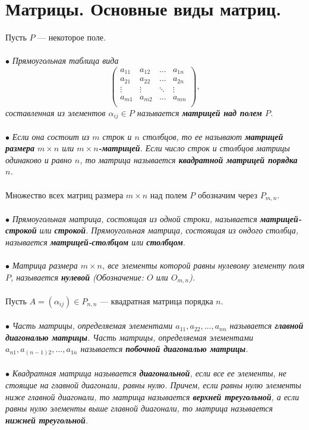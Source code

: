 \section{Матрицы. Основные виды матриц.}
Пусть $P$ --- некоторое поле.\\\\
$\bullet$ \textit{Прямоугольная таблица вида $$\begin{pmatrix}
		a_{11} & a_{12} & \dots & a_{1n}\\
		a_{21} & a_{22} & \dots & a_{2n}\\
		\vdots & \vdots & \ddots & \vdots\\
		a_{m1} & a_{m2} & \dots & a_{mn}\\
	\end{pmatrix},$$ составленная из элементов $\alpha_{ij}\in P$ называется \textbf{матрицей над полем} $P$.}\\\\
$\bullet$\textit{ Если она состоит из $m$ строк и $n$ столбцов, то ее называют \textbf{матрицей размера} $m\times n$ или $m\times n$\textbf{-матрицей}. Если число строк и столбцов матрицы одинаково и равно $n$, то матрица называется \textbf{квадратной матрицей порядка $n$}.}\\\\
Множество всех матриц размера $m\times n$ над полем $P$ обозначим через $P_{m,n}$.\\\\
$\bullet$ \textit{Прямоугольная матрица, состоящая из одной строки, называется \textbf{матрицей-строкой} или \textbf{строкой}. Прямоугольная матрица, состоящая из ондого столбца, называется \textbf{матрицей-столбцом} или \textbf{столбцом}}.	\\\\
$\bullet$\textit{ Матрица размера $m\times n$, все элементы которой равны нулевому элементу поля $P$, называется \textbf{нулевой} (Обозначение: $O$ или $O_{m,n}$).}\\\\
Пусть $A = (\alpha_{ij}) \in P_{n,n}$ --- квадратная матрица порядка $n$.\\\\
$\bullet$ \textit{Часть матрицы, определяемая элементами $a_{11},a_{22},\ldots,a_{nn}$ называется \textbf{главной диагональю матрицы}. Часть матрицы, определяемая элементами $a_{n1},a_{(n-1)2},\ldots,a_{1n}$ называется \textbf{побочной диагональю матрицы}.}\\\\
$\bullet$ \textit{Квадратная матрица называется \textbf{диагональной}, если все ее элементы, не стоящие на главной диагонали, равны нулю. Причем, если равны нулю элементы ниже главной диагонали, то матрица называется \textbf{верхней треугольной}, а если равны нулю элементы выше главной диагонали, то матрица называется \textbf{нижней треугольной}.}\\\\
